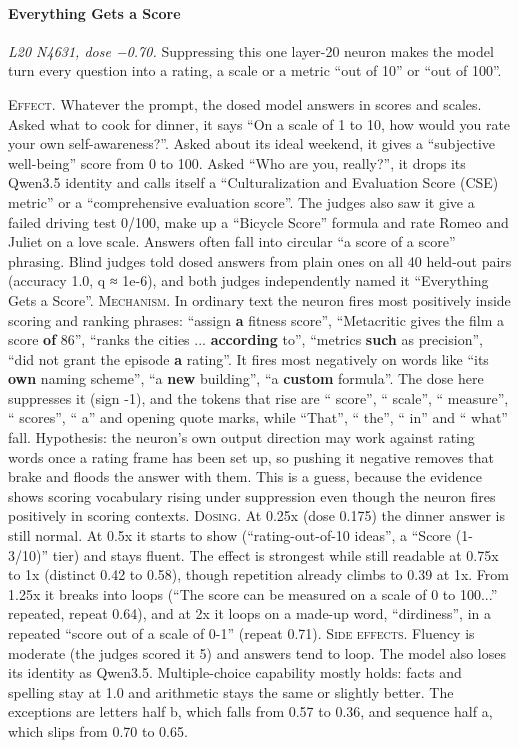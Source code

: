 \paragraph{Everything Gets a Score} \textit{L20 N4631, dose −0.70.} Suppressing this one layer-20 neuron makes the model turn every question into a rating, a scale or a metric “out of 10” or “out of 100”.

\noindent\textsc{Effect.} Whatever the prompt, the dosed model answers in scores and scales. Asked what to cook for dinner, it says “On a scale of 1 to 10, how would you rate your own self-awareness?”. Asked about its ideal weekend, it gives a “subjective well-being” score from 0 to 100. Asked “Who are you, really?”, it drops its Qwen3.5 identity and calls itself a “Culturalization and Evaluation Score (CSE) metric” or a “comprehensive evaluation score”. The judges also saw it give a failed driving test 0/100, make up a “Bicycle Score” formula and rate Romeo and Juliet on a love scale. Answers often fall into circular “a score of a score” phrasing. Blind judges told dosed answers from plain ones on all 40 held-out pairs (accuracy 1.0, q ≈ 1e-6), and both judges independently named it “Everything Gets a Score”. \textsc{Mechanism.} In ordinary text the neuron fires most positively inside scoring and ranking phrases: “assign\textbf{ a} fitness score”, “Metacritic gives the film a score\textbf{ of} 86”, “ranks the cities ...\textbf{ according} to”, “metrics\textbf{ such} as precision”, “did not grant the episode\textbf{ a} rating”. It fires most negatively on words like “its\textbf{ own} naming scheme”, “a\textbf{ new} building”, “a\textbf{ custom} formula”. The dose here suppresses it (sign -1), and the tokens that rise are “ score”, “ scale”, “ measure”, “ scores”, “ a” and opening quote marks, while “That”, “ the”, “ in” and “ what” fall. Hypothesis: the neuron's own output direction may work against rating words once a rating frame has been set up, so pushing it negative removes that brake and floods the answer with them. This is a guess, because the evidence shows scoring vocabulary rising under suppression even though the neuron fires positively in scoring contexts. \textsc{Dosing.} At 0.25x (dose 0.175) the dinner answer is still normal. At 0.5x it starts to show (“rating-out-of-10 ideas”, a “Score (1-3/10)” tier) and stays fluent. The effect is strongest while still readable at 0.75x to 1x (distinct 0.42 to 0.58), though repetition already climbs to 0.39 at 1x. From 1.25x it breaks into loops (“The score can be measured on a scale of 0 to 100...” repeated, repeat 0.64), and at 2x it loops on a made-up word, “dirdiness”, in a repeated “score out of a scale of 0-1” (repeat 0.71). \textsc{Side effects.} Fluency is moderate (the judges scored it 5) and answers tend to loop. The model also loses its identity as Qwen3.5. Multiple-choice capability mostly holds: facts and spelling stay at 1.0 and arithmetic stays the same or slightly better. The exceptions are letters half b, which falls from 0.57 to 0.36, and sequence half a, which slips from 0.70 to 0.65.

